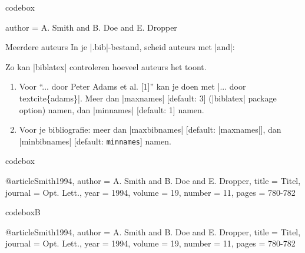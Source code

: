 
\begin{saveblock}{codebox}%
	\begin{highlightblock}
		author = {A. Smith and B. Doe and E. Dropper}
	\end{highlightblock}
\end{saveblock}



\begin{frame}{Meerdere auteurs}
	In je \hll|.bib|-bestand, scheid auteurs met \hll|and|:
	\par\medskip{}
	
	\medskip
	Zo kan \hll|biblatex| controleren hoeveel auteurs het toont.
	\begin{enumerate}[label=\arabic*)]
		\item Voor ``... door Peter Adams et al. [1]'' kan je doen met \hll|... door \\textcite\{adams\}|.
		Meer dan \hll|maxnames| [default: 3] (\hll|biblatex| package option) namen, dan
		\hll|minnames| [default: 1] namen.
		\item Voor je bibliografie: meer dan \hll|maxbibnames| [default: \hll|maxnames|], dan
		\hll|minbibnames| [default: \lstinline|minnames|] namen.
	\end{enumerate}

\end{frame}



\begin{saveblock}{codebox}%
	\begin{highlightblock}
		@article{Smith1994,
			author = {A. Smith and B. Doe and E. Dropper},
			title = {Titel},
			journal = {Opt. Lett.},
			year = 1994,
			volume = 19,
			number = 11,
			pages = {780-782}
		}
	\end{highlightblock}
\end{saveblock}


\begin{saveblock}{codeboxB}%
	\begin{highlightblock}
		@article{Smith1994,
			author = {A. Smith and B. Doe and E. Dropper},
			title = {Titel},
			journal = {Opt. Lett.},
			year = 1994,
			volume = 19,
			number = 11,
			pages = {780-782}
		}
	\end{highlightblock}
\end{saveblock}

